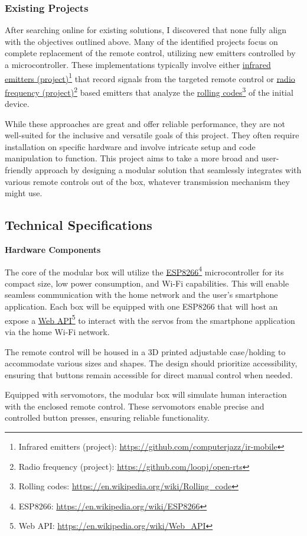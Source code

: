 \documentclass[12pt, a4paper, openany]{article}
\newcommand{\footlink}[2]{\href{#2}{#1}\footnote{{\MakeUppercase #1}: \url{#2}}}
\begin{document}
\subsubsection*{Existing Projects}

After searching online for existing solutions, I discovered that none fully align with the objectives outlined above.
Many of the identified projects focus on complete replacement of the remote control, utilizing new emitters controlled by a microcontroller.
These implementations typically involve either \footlink{infrared emitters (project)}{https://github.com/computerjazz/ir-mobile} that record signals from the targeted remote control or \footlink{radio frequency (project)}{https://github.com/loopj/open-rts} based emitters that analyze the \footlink{rolling codes}{https://en.wikipedia.org/wiki/Rolling_code} of the initial device.

While these approaches are great and offer reliable performance, they are not well-suited for the inclusive and versatile goals of this project.
They often require installation on specific hardware and involve intricate setup and code manipulation to function.
This project aims to take a more broad and user-friendly approach by designing a modular solution that seamlessly integrates with various remote controls out of the box, whatever transmission mechanism they might use.

\subsection*{Technical Specifications}

\textbf{Hardware Components}

The core of the modular box will utilize the \footlink{ESP8266}{https://en.wikipedia.org/wiki/ESP8266} microcontroller for its compact size, low power consumption, and Wi-Fi capabilities.
This will enable seamless communication with the home network and the user's smartphone application.
Each box will be equipped with one ESP8266 that will host an expose a \footlink{Web API}{https://en.wikipedia.org/wiki/Web_API} to interact with the servos from the smartphone application via the home Wi-Fi network.

The remote control will be housed in a 3D printed adjustable case/holding to accommodate various sizes and shapes.
The design should prioritize accessibility, ensuring that buttons remain accessible for direct manual control when needed.

Equipped with servomotors, the modular box will simulate human interaction with the enclosed remote control.
These servomotors enable precise and controlled button presses, ensuring reliable functionality.
\end{document}
